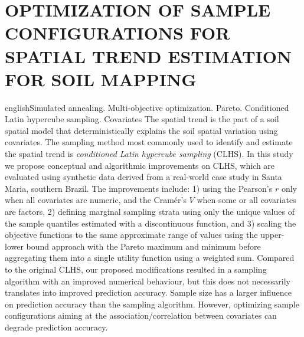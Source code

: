 \artigotrue
\chapter{OPTIMIZATION OF SAMPLE CONFIGURATIONS FOR SPATIAL TREND ESTIMATION FOR SOIL MAPPING}
\label{chap:chap08}


\def\enkeys{Simulated annealing. Multi-objective optimization. Pareto. Conditioned Latin hypercube sampling. 
Covariates}
  
\begin{chapterabstract}{english}{\enkeys}
The spatial trend is the part of a soil spatial model that deterministically explains the soil spatial 
variation using covariates. The sampling method most commonly used to identify and estimate the spatial trend 
is \emph{conditioned Latin hypercube sampling} (CLHS). In this study we propose conceptual and algorithmic 
improvements on CLHS, which are evaluated using synthetic data derived from a real-world  case study in Santa 
Maria, southern Brazil. The improvements include: 1) using the Pearson's $r$ only when all covariates are 
numeric, and the Cramér's $V$ when some or all covariates are factors, 2) defining marginal sampling 
strata using only the unique values of the sample quantiles estimated with a discontinuous function, and 3) 
scaling the objective functions to the same approximate range of values using the upper-lower bound approach 
with the Pareto maximum and minimum before aggregating them into a single utility function using a weighted 
sum. Compared to the original CLHS, our proposed modifications resulted in a sampling algorithm with an 
improved numerical behaviour, but this does not necessarily translates into improved prediction accuracy. 
Sample size has a larger influence on prediction accuracy than the sampling algorithm. However, 
optimizing sample configurations aiming at the association/correlation between covariates can degrade 
prediction accuracy.
\end{chapterabstract}

